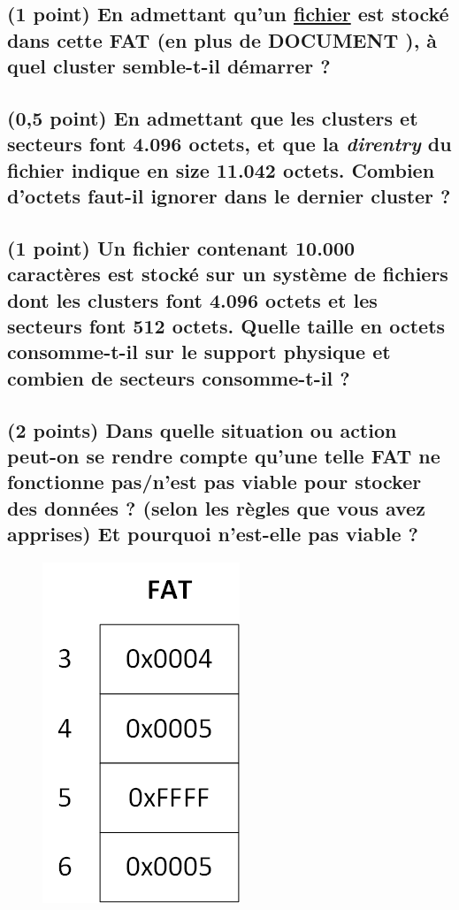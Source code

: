 \documentclass[11pt,a4paper]{article}
\begin{document}
\bigskip

\subsection{(1 point) En admettant qu'un \underline{fichier} est stocké dans cette FAT (en plus de \og DOCUMENT \fg), à quel cluster semble-t-il démarrer ?}

\bigskip
\bigskip  %
\bigskip

\subsection{(0,5 point) En admettant que les clusters et secteurs font 4.096 octets, et que la \textit{direntry} du fichier indique en size 11.042 octets. Combien d'octets faut-il ignorer dans le dernier cluster ?}

\bigskip
\bigskip  %
\bigskip  %
\bigskip

\subsection{(1 point) Un fichier contenant 10.000 caractères est stocké sur un système de fichiers dont les clusters font 4.096 octets et les secteurs font 512 octets. Quelle taille en octets consomme-t-il sur le support physique et combien de secteurs consomme-t-il ?}

\bigskip
\bigskip
\bigskip  %
\bigskip


\newpage

\subsection{(2 points) Dans quelle situation ou action peut-on se rendre compte qu'une telle FAT ne fonctionne pas/n'est pas viable pour stocker des données ? (selon les règles que vous avez apprises) Et pourquoi n'est-elle pas viable ?}

\bigskip

\begin{figure}[ht!]
\includegraphics[scale=1,left]{FAT2.png}
\end{figure}
\end{document}
